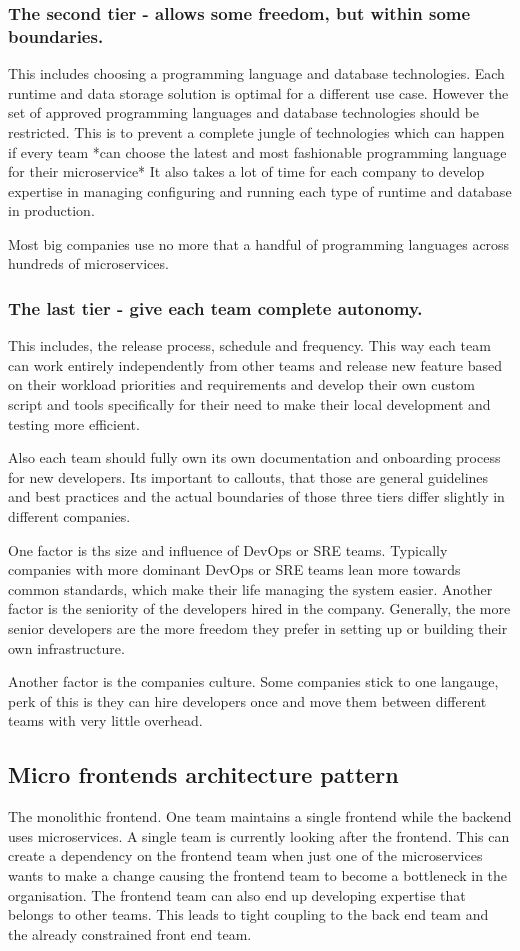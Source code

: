 \subsubsection{The second tier - allows some freedom, but within some boundaries.}
This includes choosing a programming language and database technologies.
Each runtime and data storage solution is optimal for a different use case.
However the set of approved programming languages and database technologies should be restricted.
This is to prevent a complete jungle of technologies which can happen if every team *can choose the latest and most fashionable programming language for their microservice*
It also takes a lot of time for each company to develop expertise in managing configuring and running each type of runtime and database in production.

Most big companies use no more that a handful of programming languages across hundreds of microservices.

\subsubsection{The last tier - give each team complete autonomy.}
This includes, the release process, schedule and frequency.
This way each team can work entirely independently from other teams and release new feature based on their workload priorities and requirements and develop their own custom script and tools specifically for their need to make their local development and testing more efficient.

Also each team should fully own its own documentation and onboarding process for new developers.
Its important to callouts, that those are general guidelines and best practices and the actual boundaries of those three tiers differ slightly in different companies.

One factor is ths size and influence of DevOps or SRE teams.
Typically companies with more dominant DevOps or SRE teams lean more towards common standards, which make their life managing the system easier.
Another factor is the seniority of the developers hired in the company.
Generally, the more senior developers are the more freedom they prefer in setting up or building their own infrastructure.

Another factor is the companies culture.
Some companies stick to one langauge, perk of this is they can hire developers once and move them between different teams with very little overhead.

\subsection{Micro frontends architecture pattern}
The monolithic frontend.
One team maintains a single frontend while the backend uses microservices.
A single team is currently looking after the frontend.
This can create a dependency on the frontend team when just one of the microservices wants to make a change causing the frontend team to become a bottleneck in the organisation.
The frontend team can also end up developing expertise that belongs to other teams.
This leads to tight coupling to the back end team and the already constrained front end team.

